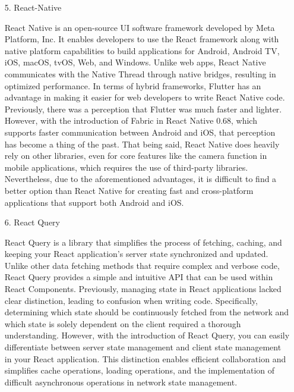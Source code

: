 \documentclass[conference, a4paper]{IEEEtran}
\begin{document}
\begin{enumerate}
\begin{enumerate}
        \item[5.]React-Native \cite{reactnative}
        \item[]React Native is an open-source UI software framework developed by Meta Platform, Inc. It enables developers to use the React framework along with native platform capabilities to build applications for Android, Android TV, iOS, macOS, tvOS, Web, and Windows. Unlike web apps, React Native communicates with the Native Thread through native bridges, resulting in optimized performance. In terms of hybrid frameworks, Flutter has an advantage in making it easier for web developers to write React Native code. Previously, there was a perception that Flutter was much faster and lighter. However, with the introduction of Fabric in React Native 0.68, which supports faster communication between Android and iOS, that perception has become a thing of the past. That being said, React Native does heavily rely on other libraries, even for core features like the camera function in mobile applications, which requires the use of third-party libraries. Nevertheless, due to the aforementioned advantages, it is difficult to find a better option than React Native for creating fast and cross-platform applications that support both Android and iOS.\\

        \item[6.]React Query \cite{tanstackquery}
        \item[]React Query is a library that simplifies the process of fetching, caching, and keeping your React application's server state synchronized and updated. Unlike other data fetching methods that require complex and verbose code, React Query provides a simple and intuitive API that can be used within React Components. Previously, managing state in React applications lacked clear distinction, leading to confusion when writing code. Specifically, determining which state should be continuously fetched from the network and which state is solely dependent on the client required a thorough understanding. However, with the introduction of React Query, you can easily differentiate between server state management and client state management in your React application. This distinction enables efficient collaboration and simplifies cache operations, loading operations, and the implementation of difficult asynchronous operations in network state management. \\


\end{enumerate}
\end{enumerate}
\end{document}
